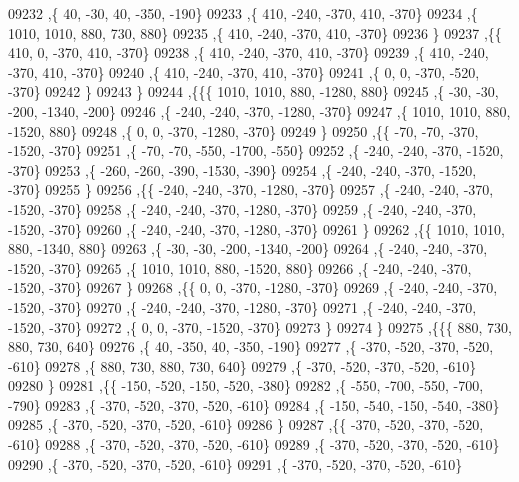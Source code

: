 \begin{DoxyCode}
09232     ,\{    40,   -30,    40,  -350,  -190\}
09233     ,\{   410,  -240,  -370,   410,  -370\}
09234     ,\{  1010,  1010,   880,   730,   880\}
09235     ,\{   410,  -240,  -370,   410,  -370\}
09236     \}
09237    ,\{\{   410,     0,  -370,   410,  -370\}
09238     ,\{   410,  -240,  -370,   410,  -370\}
09239     ,\{   410,  -240,  -370,   410,  -370\}
09240     ,\{   410,  -240,  -370,   410,  -370\}
09241     ,\{     0,     0,  -370,  -520,  -370\}
09242     \}
09243    \}
09244   ,\{\{\{  1010,  1010,   880, -1280,   880\}
09245     ,\{   -30,   -30,  -200, -1340,  -200\}
09246     ,\{  -240,  -240,  -370, -1280,  -370\}
09247     ,\{  1010,  1010,   880, -1520,   880\}
09248     ,\{     0,     0,  -370, -1280,  -370\}
09249     \}
09250    ,\{\{   -70,   -70,  -370, -1520,  -370\}
09251     ,\{   -70,   -70,  -550, -1700,  -550\}
09252     ,\{  -240,  -240,  -370, -1520,  -370\}
09253     ,\{  -260,  -260,  -390, -1530,  -390\}
09254     ,\{  -240,  -240,  -370, -1520,  -370\}
09255     \}
09256    ,\{\{  -240,  -240,  -370, -1280,  -370\}
09257     ,\{  -240,  -240,  -370, -1520,  -370\}
09258     ,\{  -240,  -240,  -370, -1280,  -370\}
09259     ,\{  -240,  -240,  -370, -1520,  -370\}
09260     ,\{  -240,  -240,  -370, -1280,  -370\}
09261     \}
09262    ,\{\{  1010,  1010,   880, -1340,   880\}
09263     ,\{   -30,   -30,  -200, -1340,  -200\}
09264     ,\{  -240,  -240,  -370, -1520,  -370\}
09265     ,\{  1010,  1010,   880, -1520,   880\}
09266     ,\{  -240,  -240,  -370, -1520,  -370\}
09267     \}
09268    ,\{\{     0,     0,  -370, -1280,  -370\}
09269     ,\{  -240,  -240,  -370, -1520,  -370\}
09270     ,\{  -240,  -240,  -370, -1280,  -370\}
09271     ,\{  -240,  -240,  -370, -1520,  -370\}
09272     ,\{     0,     0,  -370, -1520,  -370\}
09273     \}
09274    \}
09275   ,\{\{\{   880,   730,   880,   730,   640\}
09276     ,\{    40,  -350,    40,  -350,  -190\}
09277     ,\{  -370,  -520,  -370,  -520,  -610\}
09278     ,\{   880,   730,   880,   730,   640\}
09279     ,\{  -370,  -520,  -370,  -520,  -610\}
09280     \}
09281    ,\{\{  -150,  -520,  -150,  -520,  -380\}
09282     ,\{  -550,  -700,  -550,  -700,  -790\}
09283     ,\{  -370,  -520,  -370,  -520,  -610\}
09284     ,\{  -150,  -540,  -150,  -540,  -380\}
09285     ,\{  -370,  -520,  -370,  -520,  -610\}
09286     \}
09287    ,\{\{  -370,  -520,  -370,  -520,  -610\}
09288     ,\{  -370,  -520,  -370,  -520,  -610\}
09289     ,\{  -370,  -520,  -370,  -520,  -610\}
09290     ,\{  -370,  -520,  -370,  -520,  -610\}
09291     ,\{  -370,  -520,  -370,  -520,  -610\}

\end{DoxyCode}
